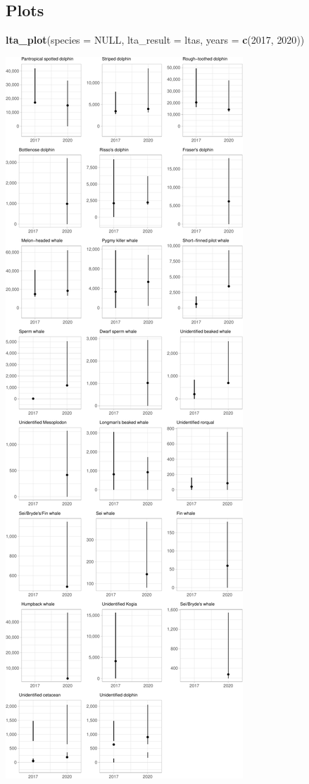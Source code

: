 \documentclass[
]{book}
\newenvironment{Shaded}{\begin{snugshade}}{\end{snugshade}}
\newcommand{\DataTypeTok}[1]{\textcolor[rgb]{0.13,0.29,0.53}{#1}}
\newcommand{\DecValTok}[1]{\textcolor[rgb]{0.00,0.00,0.81}{#1}}
\newcommand{\KeywordTok}[1]{\textcolor[rgb]{0.13,0.29,0.53}{\textbf{#1}}}
\newcommand{\NormalTok}[1]{#1}
\newcommand{\OtherTok}[1]{\textcolor[rgb]{0.56,0.35,0.01}{#1}}
\begin{document}
\hypertarget{plots-1}{%
\subsection*{Plots}\label{plots-1}}

\begin{Shaded}
\begin{Highlighting}[]
\KeywordTok{lta_plot}\NormalTok{(}\DataTypeTok{species =} \OtherTok{NULL}\NormalTok{, }
         \DataTypeTok{lta_result =}\NormalTok{ ltas, }
         \DataTypeTok{years =} \KeywordTok{c}\NormalTok{(}\DecValTok{2017}\NormalTok{, }\DecValTok{2020}\NormalTok{))}
\end{Highlighting}
\end{Shaded}

\includegraphics{figures/unnamed-chunk-310-1.pdf}
\end{document}
